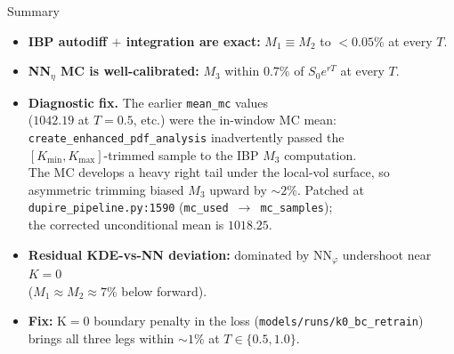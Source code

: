 \begin{frame}{Summary}
    \begin{itemize}
        \item \textbf{IBP autodiff $+$ integration are exact:} $M_1 \equiv M_2$ to $<\!0.05\%$ at every $T$.
        \item \textbf{NN$_\eta$ MC is well-calibrated:} $M_3$ within $0.7\%$ of $S_0 e^{rT}$ at every $T$.
        \medskip
        \item[\textcolor{ntugold}{\textbullet}] \textbf{Diagnostic fix.} The earlier \texttt{mean\_mc} values \\
              ($1042.19$ at $T=0.5$, etc.) were the in-window MC mean: \\
              \texttt{create\_enhanced\_pdf\_analysis} inadvertently passed the \\
              $[K_{\min},K_{\max}]$-trimmed sample to the IBP $M_3$ computation. \\
              The MC develops a heavy right tail under the local-vol surface, so \\
              asymmetric trimming biased $M_3$ upward by $\sim\!2\%$. Patched at \\
              \texttt{dupire\_pipeline.py:1590} (\texttt{mc\_used}~$\to$~\texttt{mc\_samples}); \\
              the corrected unconditional mean is $1018.25$.
        \medskip
        \item \textbf{Residual KDE-vs-NN deviation:} dominated by NN$_\varphi$ undershoot near $K = 0$ \\
              ($M_1 \approx M_2 \approx 7\%$ below forward).
        \item \textbf{Fix:} K$=$0 boundary penalty in the loss (\texttt{models/runs/k0\_bc\_retrain}) brings all three legs within $\sim\!1\%$ at $T \in \{0.5, 1.0\}$.
    \end{itemize}
\end{frame}
